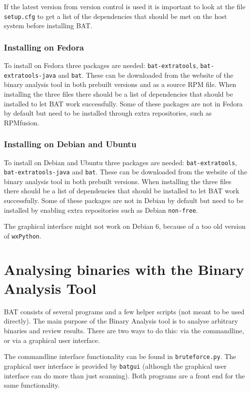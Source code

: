 \documentclass[10pt]{article}
\begin{document}
If the latest version from version control is used it is important to look at
the file \texttt{setup.cfg} to get a list of the dependencies that should be
met on the host system before installing BAT.

\subsubsection{Installing on Fedora}

To install on Fedora three packages are needed:
\texttt{bat-extratools}, \texttt{bat-extratools-java} and \texttt{bat}. These
can be downloaded from the website of the binary analysis tool in both prebuilt
versions and as a source RPM file. When installing the three files there should
be a list of dependencies that should be installed to let BAT work
successfully. Some of these packages are not in Fedora by default but need to
be installed through extra repositories, such as RPMfusion.

\subsubsection{Installing on Debian and Ubuntu}

To install on Debian and Ubuntu three packages are needed:
\texttt{bat-extratools}, \texttt{bat-extratools-java} and \texttt{bat}. These
can be downloaded from the website of the binary analysis tool in both prebuilt
versions. When installing the three files there should be a list of
dependencies that should be installed to let BAT work successfully. Some of
these packages are not in Debian by default but need to be installed by
enabling extra repositories such as Debian \texttt{non-free}.

The graphical interface might not work on Debian 6, because of a too old
version of \texttt{wxPython}.

\section{Analysing binaries with the Binary Analysis Tool}

BAT consists of several programs and a few helper scripts (not meant to be
used directly). The main purpose of the Binary Analysis tool is to analyse
arbitrary binaries and review results. There are two ways to do this: via the
commandline, or via a graphical user interface.

The commandline interface functionality can be found in \texttt{bruteforce.py}.
The graphical user interface is provided by \texttt{batgui} (although the
graphical user interface can do more than just scanning). Both programs are a
front end for the same functionality.
\end{document}
